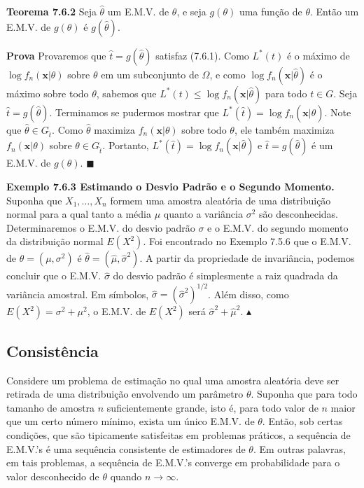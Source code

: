 \textbf{Teorema 7.6.2} Seja $\hat{\theta}$ um E.M.V. de $\theta$, e seja $g(\theta)$ uma função de $\theta$. Então um E.M.V. de $g(\theta)$ é $g(\hat{\theta})$.

\textbf{Prova} Provaremos que $\hat{t} = g(\hat{\theta})$ satisfaz (7.6.1). Como $L^*(t)$ é o máximo de $\log f_n(\mathbf{x}|\theta)$ sobre $\theta$ em um subconjunto de $\Omega$, e como $\log f_n(\mathbf{x}|\hat{\theta})$ é o máximo sobre todo $\theta$, sabemos que $L^*(t) \le \log f_n(\mathbf{x}|\hat{\theta})$ para todo $t \in G$. Seja $\hat{t} = g(\hat{\theta})$. Terminamos se pudermos mostrar que $L^*(\hat{t}) = \log f_n(\mathbf{x}|\hat{\theta})$. Note que $\hat{\theta} \in G_{\hat{t}}$. Como $\hat{\theta}$ maximiza $f_n(\mathbf{x}|\theta)$ sobre todo $\theta$, ele também maximiza $f_n(\mathbf{x}|\theta)$ sobre $\theta \in G_{\hat{t}}$. Portanto, $L^*(\hat{t}) = \log f_n(\mathbf{x}|\hat{\theta})$ e $\hat{t} = g(\hat{\theta})$ é um E.M.V. de $g(\theta)$. $\blacksquare$

\textbf{Exemplo 7.6.3 Estimando o Desvio Padrão e o Segundo Momento.} Suponha que $X_1, \dots, X_n$ formem uma amostra aleatória de uma distribuição normal para a qual tanto a média $\mu$ quanto a variância $\sigma^2$ são desconhecidas. Determinaremos o E.M.V. do desvio padrão $\sigma$ e o E.M.V. do segundo momento da distribuição normal $E(X^2)$. Foi encontrado no Exemplo 7.5.6 que o E.M.V. de $\theta = (\mu, \sigma^2)$ é $\hat{\theta} = (\hat{\mu}, \hat{\sigma}^2)$. A partir da propriedade de invariância, podemos concluir que o E.M.V. $\hat{\sigma}$ do desvio padrão é simplesmente a raiz quadrada da variância amostral. Em símbolos, $\hat{\sigma} = (\hat{\sigma}^2)^{1/2}$. Além disso, como $E(X^2) = \sigma^2 + \mu^2$, o E.M.V. de $E(X^2)$ será $\hat{\sigma}^2 + \hat{\mu}^2$. $\blacktriangle$

\subsection*{Consistência}

Considere um problema de estimação no qual uma amostra aleatória deve ser retirada de uma distribuição envolvendo um parâmetro $\theta$. Suponha que para todo tamanho de amostra $n$ suficientemente grande, isto é, para todo valor de $n$ maior que um certo número mínimo, exista um único E.M.V. de $\theta$. Então, sob certas condições, que são tipicamente satisfeitas em problemas práticos, a sequência de E.M.V.'s é uma sequência consistente de estimadores de $\theta$. Em outras palavras, em tais problemas, a sequência de E.M.V.'s converge em probabilidade para o valor desconhecido de $\theta$ quando $n \to \infty$.

